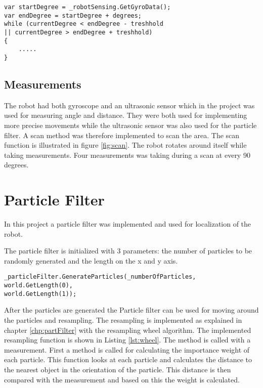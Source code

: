 \lstset{style=sharpc}
\begin{lstlisting}[caption={Pseudo code for turning the robot}, label=lst:turn, mathescape=true]             
var startDegree = _robotSensing.GetGyroData();
var endDegree = startDegree + degrees;
while (currentDegree < endDegree - treshhold 
|| currentDegree > endDegree + treshhold)
{	
	.....
}
\end{lstlisting}


\FloatBarrier
\subsection{Measurements}
The robot had both gyroscope and an ultrasonic sensor which in the project was used for measuring angle and distance. They were both used for implementing more precise movements while the ultrasonic sensor was also used for the particle filter. A scan method was therefore implemented to scan the area. The scan function is illustrated in figure \ref{fig:scan}. The robot rotates around itself while taking measurements. Four measurements was taking during a scan at every 90 degrees.


\FloatBarrier
\section{Particle Filter}
In this project a particle filter was implemented and used for localization of the robot. 

The particle filter is initialized with 3 parameters: the number of particles to be randomly generated and the length on the x and y axis.

\lstset{style=sharpc}
\begin{lstlisting}[caption={Initialization of the particle filter}, label=lst:initPart, mathescape=true]             
_particleFilter.GenerateParticles(_numberOfParticles, world.GetLength(0),
world.GetLength(1));
\end{lstlisting}

After the particles are generated the Particle filter can be used for moving around the particles and resampling. The resampling is implemented as explained in chapter \ref{chp:partFilter} with the resampling wheel algorithm. The implemented resampling function is shown in Listing \ref{lst:wheel}. The method is called with a measurement. First a method is called for calculating the importance weight of each particle. This function looks at each particle and calculates the distance to the nearest object in the orientation of the particle. This distance is then compared with the measurement and based on this the weight is calculated.

